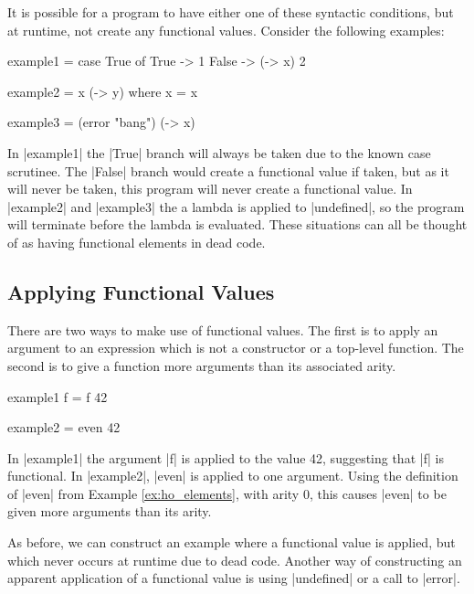 \documentclass[preprint]{sigplanconf}
\begin{document}
It is possible for a program to have either one of these syntactic conditions, but at runtime, not create any functional values. Consider the following examples:

\begin{code}
example1 = case  True of
                 True   -> 1
                 False  -> (\x -> x) 2

example2 = x (\y -> y)
    where x = x

example3 = (error "bang") (\x -> x)
\end{code}

In |example1| the |True| branch will always be taken due to the known case scrutinee. The |False| branch would create a functional value if taken, but as it will never be taken, this program will never create a functional value. In |example2| and |example3| the a lambda is applied to |undefined|, so the program will terminate before the lambda is evaluated. These situations can all be thought of as having functional elements in dead code.


\subsection{Applying Functional Values}

There are two ways to make use of functional values. The first is to apply an argument to an expression which is not a constructor or a top-level function. The second is to give a function more arguments than its associated arity.

\begin{example}
\begin{code}
example1 f = f 42

example2 = even 42
\end{code}

In |example1| the argument |f| is applied to the value 42, suggesting that |f| is functional. In |example2|, |even| is applied to one argument. Using the definition of |even| from Example \ref{ex:ho_elements}, with arity 0, this causes |even| to be given more arguments than its arity.
\end{example}

As before, we can construct an example where a functional value is applied, but which never occurs at runtime due to dead code. Another way of constructing an apparent application of a functional value is using |undefined| or a call to |error|.
\end{document}

